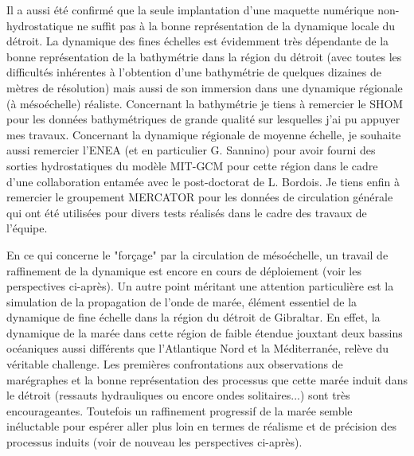 Il a aussi été confirmé que la seule implantation d'une maquette numérique non-hydrosta\-tique ne suffit pas à la bonne représentation de la dynamique locale du détroit. La dynamique des fines échelles est évidemment très dépendante de la bonne représentation de la bathymétrie dans la région du détroit (avec toutes les difficultés inhérentes à l'obtention d'une bathymétrie de quelques dizaines de mètres de résolution) mais aussi de son immersion dans une dynamique régionale (à mésoéchelle) réaliste. Concernant la bathymétrie je tiens à remercier le SHOM pour les données bathymétriques de grande qualité sur lesquelles j'ai pu appuyer mes travaux. Concernant la dynamique régionale de moyenne échelle, je souhaite aussi remercier l'ENEA (et en particulier G. Sannino) pour avoir fourni des sorties hydrostatiques du modèle MIT-GCM pour cette région dans le cadre d'une collaboration entamée avec le post-doctorat de L. Bordois. Je tiens enfin à remercier le groupement MERCATOR pour les données de circulation générale qui ont été utilisées pour divers tests réalisés dans le cadre des travaux de l'équipe.

En ce qui concerne le "forçage" par la circulation de mésoéchelle, un travail de raffinement de la dynamique est encore en cours de déploiement (voir les perspectives ci-après). Un autre point méritant une attention particulière est la simulation de la propagation de l'onde de marée, élément essentiel de la dynamique de fine échelle dans la région du détroit de Gibraltar. En effet, la dynamique de la marée dans cette région de faible étendue jouxtant deux bassins océaniques aussi différents que l'Atlantique Nord et la Méditerranée, relève du véritable challenge. Les premières confrontations aux observations de marégraphes et la bonne représentation des processus que cette marée induit dans le détroit (ressauts hydrauliques ou encore ondes solitaires...) sont très encourageantes. Toutefois un raffinement progressif de la marée semble inéluctable pour espérer aller plus loin en termes de réalisme et de précision des processus induits (voir de nouveau les perspectives ci-après).

